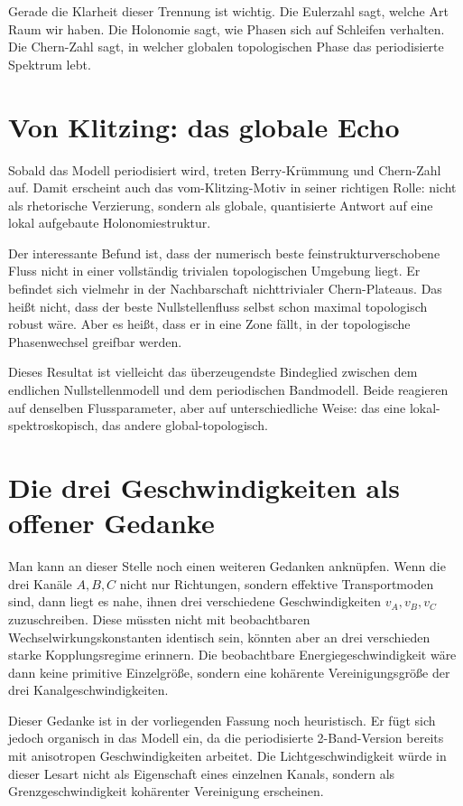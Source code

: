\documentclass[11pt,a4paper]{article}
\theoremstyle{remark}
\begin{document}
	Gerade die Klarheit dieser Trennung ist wichtig. Die Eulerzahl sagt, welche Art Raum wir haben. Die Holonomie sagt, wie Phasen sich auf Schleifen verhalten. Die Chern-Zahl sagt, in welcher globalen topologischen Phase das periodisierte Spektrum lebt.
	
	\section{Von Klitzing: das globale Echo}
	
	Sobald das Modell periodisiert wird, treten Berry-Krümmung und Chern-Zahl auf. Damit erscheint auch das vom-Klitzing-Motiv in seiner richtigen Rolle: nicht als rhetorische Verzierung, sondern als globale, quantisierte Antwort auf eine lokal aufgebaute Holonomiestruktur.
	
	Der interessante Befund ist, dass der numerisch beste feinstrukturverschobene Fluss nicht in einer vollständig trivialen topologischen Umgebung liegt. Er befindet sich vielmehr in der Nachbarschaft nichttrivialer Chern-Plateaus. Das heißt nicht, dass der beste Nullstellenfluss selbst schon maximal topologisch robust wäre. Aber es heißt, dass er in eine Zone fällt, in der topologische Phasenwechsel greifbar werden.
	
	Dieses Resultat ist vielleicht das überzeugendste Bindeglied zwischen dem endlichen Nullstellenmodell und dem periodischen Bandmodell. Beide reagieren auf denselben Flussparameter, aber auf unterschiedliche Weise: das eine lokal-spektroskopisch, das andere global-topologisch.
	
	\section{Die drei Geschwindigkeiten als offener Gedanke}
	
	Man kann an dieser Stelle noch einen weiteren Gedanken anknüpfen. Wenn die drei Kanäle $A,B,C$ nicht nur Richtungen, sondern effektive Transportmoden sind, dann liegt es nahe, ihnen drei verschiedene Geschwindigkeiten $v_A,v_B,v_C$ zuzuschreiben. Diese müssten nicht mit beobachtbaren Wechselwirkungskonstanten identisch sein, könnten aber an drei verschieden starke Kopplungsregime erinnern. Die beobachtbare Energiegeschwindigkeit wäre dann keine primitive Einzelgröße, sondern eine kohärente Vereinigungsgröße der drei Kanalgeschwindigkeiten.
	
	Dieser Gedanke ist in der vorliegenden Fassung noch heuristisch. Er fügt sich jedoch organisch in das Modell ein, da die periodisierte 2-Band-Version bereits mit anisotropen Geschwindigkeiten arbeitet. Die Lichtgeschwindigkeit würde in dieser Lesart nicht als Eigenschaft eines einzelnen Kanals, sondern als Grenzgeschwindigkeit kohärenter Vereinigung erscheinen.
	
\end{document}
